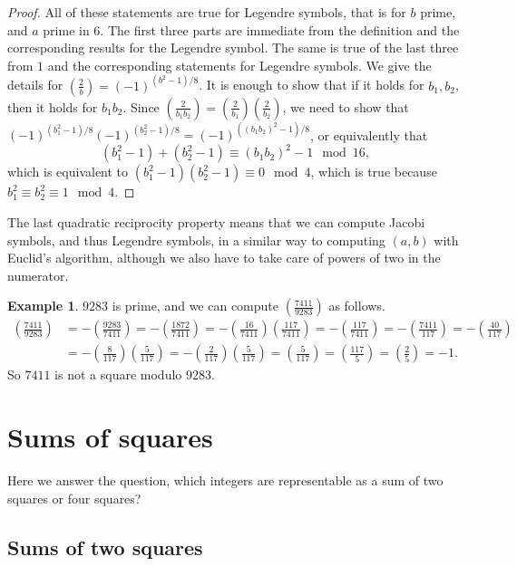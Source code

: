 \documentclass{article}
\newcommand{\rb}[1]{\left( #1 \right)}
\newcommand{\legendre}[2]{\rb{\tfrac{#1}{#2}}}
\theoremstyle{definition}\newtheorem{definition}{Definition}
\theoremstyle{definition}\newtheorem{remark}[definition]{Remark}
\theoremstyle{definition}\newtheorem*{example}{Example}
\theoremstyle{definition}\newtheorem*{note}{Note}
\begin{document}
\begin{proof}
All of these statements are true for Legendre symbols, that is for $ b $ prime, and $ a $ prime in $ 6 $. The first three parts are immediate from the definition and the corresponding results for the Legendre symbol. The same is true of the last three from $ 1 $ and the corresponding statements for Legendre symbols. We give the details for $ \legendre{2}{b} = \rb{-1}^{\rb{b^2 - 1} / 8} $. It is enough to show that if it holds for $ b_1, b_2 $, then it holds for $ b_1b_2 $. Since $ \legendre{2}{b_1b_2} = \legendre{2}{b_1}\legendre{2}{b_2} $, we need to show that $ \rb{-1}^{\rb{b_1^2 - 1} / 8}\rb{-1}^{\rb{b_2^2 - 1} / 8} = \rb{-1}^{\rb{\rb{b_1b_2}^2 - 1} / 8} $, or equivalently that
$$ \rb{b_1^2 - 1} + \rb{b_2^2 - 1} \equiv \rb{b_1b_2}^2 - 1 \mod 16, $$
which is equivalent to $ \rb{b_1^2 - 1}\rb{b_2^2 - 1} \equiv 0 \mod 4 $, which is true because $ b_1^2 \equiv b_2^2 \equiv 1 \mod 4 $.
\end{proof}

The last quadratic reciprocity property means that we can compute Jacobi symbols, and thus Legendre symbols, in a similar way to computing $ \rb{a, b} $ with Euclid's algorithm, although we also have to take care of powers of two in the numerator.

\begin{example}
$ 9283 $ is prime, and we can compute $ \legendre{7411}{9283} $ as follows.
\begin{align*}
\legendre{7411}{9283}
& = -\legendre{9283}{7411} = -\legendre{1872}{7411} = -\legendre{16}{7411}\legendre{117}{7411} = -\legendre{117}{7411} = -\legendre{7411}{117} = -\legendre{40}{117} \\
& = -\legendre{8}{117}\legendre{5}{117} = -\legendre{2}{117}\legendre{5}{117} = \legendre{5}{117} = \legendre{117}{5} = \legendre{2}{5} = -1.
\end{align*}
So $ 7411 $ is not a square modulo $ 9283 $.
\end{example}

\section{Sums of squares}

Here we answer the question, which integers are representable as a sum of two squares or four squares?

\subsection{Sums of two squares}
\end{document}
